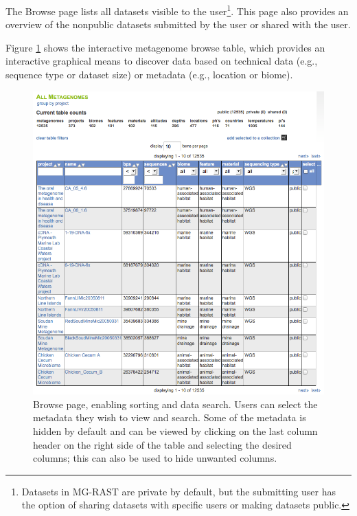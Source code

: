 \documentclass[12pt,fullpage]{report}
\begin{document}
The Browse page lists all datasets visible to the user\footnote{Datasets in MG-RAST are private by default, but the submitting user has the option of sharing datasets with specific users or  making datasets public.}. This page also provides an overview of the nonpublic datasets submitted by the user or shared with the user.

Figure \ref{fig:metagenome-browser} shows the interactive metagenome browse table, which provides an interactive graphical means to discover data based on technical data (e.g., sequence type or dataset size) or metadata (e.g., location or biome).

\begin{figure}
\begin{center}
\includegraphics[width=6in]{Images/metagenome-browser.png}
\end{center}
\caption{
Browse page, enabling sorting and data search. Users can select the metadata they wish to view and search. Some of the metadata is hidden by default and can be viewed by clicking on the last column header on the right side of the table and selecting the desired columns; this can also be used to hide unwanted columns.
}
\label{fig:metagenome-browser}
\end{figure}
\end{document}
